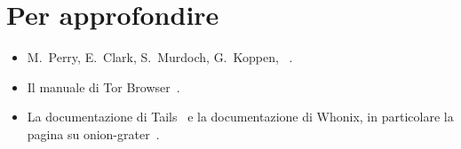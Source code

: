 \section*{Per approfondire}
\begin{itemize}
  \item M.~Perry, E.~Clark, S.~Murdoch, G.~Koppen, ~\cite{perry2018torbrowser}.
  \item Il manuale di Tor Browser~\cite{tbmanual}.
  \item La documentazione di Tails~\cite{tailsabout} e la documentazione di Whonix, in particolare la pagina su onion-grater~\cite{whonixgrater}.
\end{itemize}
